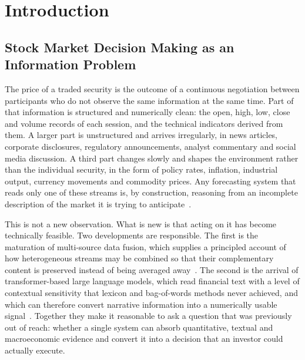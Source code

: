 \chapter{Introduction}
\label{ch:intro}

\section{Stock Market Decision Making as an Information Problem}

The price of a traded security is the outcome of a continuous negotiation between
participants who do not observe the same information at the same time. Part of that
information is structured and numerically clean: the open, high, low, close and volume
records of each session, and the technical indicators derived from them. A larger part is
unstructured and arrives irregularly, in news articles, corporate disclosures, regulatory
announcements, analyst commentary and social media discussion. A third part changes slowly
and shapes the environment rather than the individual security, in the form of policy rates,
inflation, industrial output, currency movements and commodity prices. Any forecasting
system that reads only one of these streams is, by construction, reasoning from an
incomplete description of the market it is trying to
anticipate~\cite{snasel2024,long2024,nti2021}.

This is not a new observation. What is new is that acting on it has become technically
feasible. Two developments are responsible. The first is the maturation of multi-source
data fusion, which supplies a principled account of how heterogeneous streams may be
combined so that their complementary content is preserved instead of being averaged
away~\cite{snasel2024,zhang2022fusion,li2023datafusion}. The second is the arrival of
transformer-based large language models, which read financial text with a level of
contextual sensitivity that lexicon and bag-of-words methods never achieved, and which can
therefore convert narrative information into a numerically usable
signal~\cite{vaswani2017,araci2019,li2024llmsurvey}. Together they make it reasonable to ask
a question that was previously out of reach: whether a single system can absorb
quantitative, textual and macroeconomic evidence and convert it into a decision that an
investor could actually execute.

